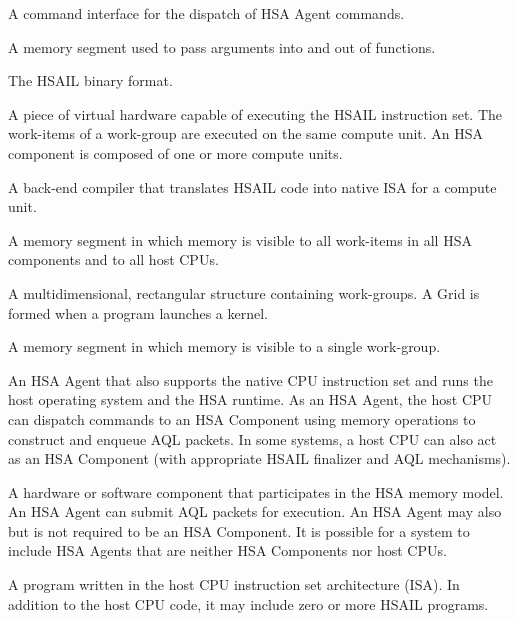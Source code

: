\documentclass[final,oneside]{book}
\begin{document}
\begin{description}[itemsep=5pt,leftmargin=0cm, labelindent=0cm]

\item[Architected Queuing Language (AQL)] A command interface for the dispatch
  of HSA Agent commands.

\item[Arg segment] A memory segment used to pass arguments into and out of
  functions.

\item[BRIG] The HSAIL binary format.

\item[Compute unit] A piece of virtual hardware capable of executing the HSAIL
  instruction set. The work-items of a work-group are executed on the same
  compute unit. An HSA component is composed of one or more compute units.

\item[Finalizer] A back-end compiler that translates HSAIL code into native ISA
  for a compute unit.

\item[Global segment] A memory segment in which memory is visible to all
  work-items in all HSA components and to all host CPUs.

\item[Grid] A multidimensional, rectangular structure containing work-groups. A
  Grid is formed when a program launches a kernel.

\item[Group segment] A memory segment in which memory is visible to a single
  work-group.

\item[Host CPU] An HSA Agent that also supports the native CPU instruction set
  and runs the host operating system and the HSA runtime. As an HSA Agent, the
  host CPU can dispatch commands to an HSA Component using memory operations to
  construct and enqueue AQL packets. In some systems, a host CPU can also act as
  an HSA Component (with appropriate HSAIL finalizer and AQL mechanisms).

\item[HSA Agent] A hardware or software component that participates in the HSA
  memory model. An HSA Agent can submit AQL packets for execution. An HSA Agent
  may also but is not required to be an HSA Component. It is possible for a
  system to include HSA Agents that are neither HSA Components nor host CPUs.

\item[HSA application] A program written in the host CPU instruction set
  architecture (ISA). In addition to the host CPU code, it may include zero or
  more HSAIL programs.


\end{description}
\end{document}
